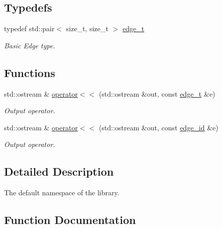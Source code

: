 \subsection*{Typedefs}
\begin{DoxyCompactItemize}
\item 
\hypertarget{namespacemerlin_a44eb24328668c9618f20915763bd3192}{}typedef std\+::pair$<$ size\+\_\+t, size\+\_\+t $>$ \hyperlink{namespacemerlin_a44eb24328668c9618f20915763bd3192}{edge\+\_\+t}\label{namespacemerlin_a44eb24328668c9618f20915763bd3192}

\begin{DoxyCompactList}\small\item\em Basic Edge type. \end{DoxyCompactList}\end{DoxyCompactItemize}
\subsection*{Functions}
\begin{DoxyCompactItemize}
\item 
std\+::ostream \& \hyperlink{namespacemerlin_a01feb9192b41e5bd4fb4a785595e6124}{operator$<$$<$} (std\+::ostream \&out, const \hyperlink{namespacemerlin_a44eb24328668c9618f20915763bd3192}{edge\+\_\+t} \&e)
\begin{DoxyCompactList}\small\item\em Output operator. \end{DoxyCompactList}\item 
std\+::ostream \& \hyperlink{namespacemerlin_ac50e5d216fd070db6c46c802bc5e2a51}{operator$<$$<$} (std\+::ostream \&out, const \hyperlink{structmerlin_1_1edge__id}{edge\+\_\+id} \&e)
\begin{DoxyCompactList}\small\item\em Output operator. \end{DoxyCompactList}\end{DoxyCompactItemize}


\subsection{Detailed Description}
The default namespace of the library. 

\subsection{Function Documentation}
\hypertarget{namespacemerlin_a01feb9192b41e5bd4fb4a785595e6124}{}
